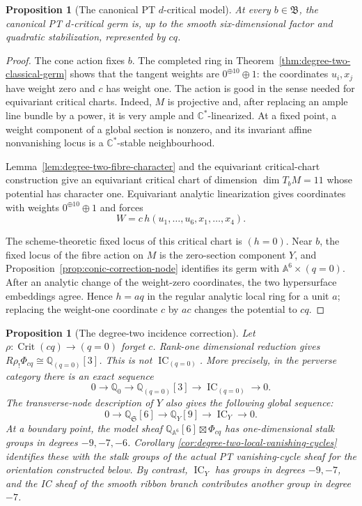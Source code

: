 \documentclass[11pt,reqno]{amsart}
\newtheorem{proposition}[theorem]{Proposition}
\theoremstyle{definition}
\newcommand{\C}{\mathbb C}
\newcommand{\Q}{\mathbb Q}
\newcommand{\IC}{\operatorname{IC}}
\begin{document}
\begin{proposition}[The canonical PT $d$-critical model]
\label{prop:degree-two-pt-critical-model}
At every $b\in\mathfrak B$, the canonical PT $d$-critical germ is, up to
the smooth six-dimensional factor and quadratic stabilization, represented
by $cq$.
\end{proposition}

\begin{proof}
The cone action fixes $b$.  The completed ring in
Theorem~\ref{thm:degree-two-classical-germ} shows that the tangent weights
are $0^{\oplus10}\oplus1$: the coordinates $u_i,x_j$ have weight zero and
$c$ has weight one.  The action is good in the sense needed for equivariant
critical charts.  Indeed, $M$ is projective and, after replacing an ample
line bundle by a power, it is very ample and $\C^*$-linearized.  At a fixed point,
a weight component of a global section is nonzero, and its invariant affine
nonvanishing locus is a $\C^*$-stable neighbourhood.

Lemma~\ref{lem:degree-two-fibre-character} and the
equivariant critical-chart construction
\cite[Proposition~2.43]{JoyceDcritical} give an equivariant critical chart
of dimension $\dim T_bM=11$ whose potential has character one.  Equivariant
analytic linearization gives coordinates with weights
$0^{\oplus10}\oplus1$ and forces
\[
 W=c\,h(u_1,\ldots,u_6,x_1,\ldots,x_4).
\]

The scheme-theoretic fixed locus of this critical chart is $(h=0)$.  Near
$b$, the fixed locus of the fibre action on $M$ is the zero-section
component $Y$, and Proposition~\ref{prop:conic-correction-node} identifies
its germ with $\mathbb A^6\times(q=0)$.  After an analytic change of the
weight-zero coordinates, the two hypersurface embeddings agree.  Hence
$h=a q$ in the regular analytic local ring for a unit $a$; replacing the
weight-one coordinate $c$ by $ac$ changes the potential to $cq$.
\end{proof}

\begin{proposition}[The degree-two incidence correction]
\label{prop:degree-two-vc}
Let $\rho:\operatorname{Crit}(cq)\to(q=0)$ forget $c$.  Rank-one dimensional
reduction gives
$R\rho_!\Phi_{cq}\cong\Q_{(q=0)}[3]$.  This is not $\IC_{(q=0)}$.
More precisely, in the perverse category there is an exact sequence
\[
 0\longrightarrow\Q_{0}\longrightarrow\Q_{(q=0)}[3]
  \longrightarrow\IC_{(q=0)}\longrightarrow0.
\]
The transverse-node description of $Y$ also gives the following global
sequence:
\[
 0\longrightarrow\Q_{\mathfrak S}[6]
 \longrightarrow\Q_Y[9]\longrightarrow\IC_Y\longrightarrow0.
\]
At a boundary point, the model sheaf
$\Q_{\mathbb A^6}[6]\boxtimes\Phi_{cq}$ has one-dimensional stalk groups
in degrees $-9,-7,-6$.  Corollary
\ref{cor:degree-two-local-vanishing-cycles} identifies these with the stalk
groups of the actual PT vanishing-cycle sheaf for the orientation constructed
below.  By contrast, $\IC_Y$ has
groups in degrees $-9,-7$, and the IC sheaf of the smooth ribbon branch
contributes another group in degree $-7$.
\end{proposition}
\end{document}
